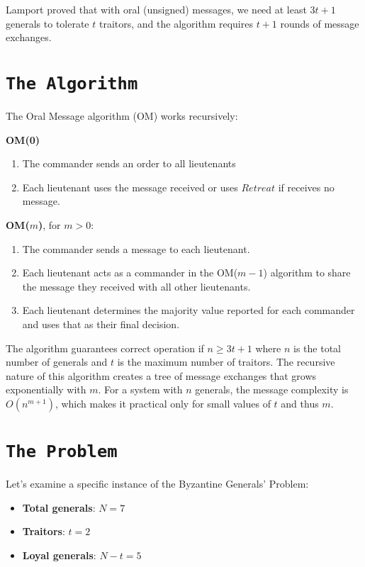 \documentclass[11pt]{article}
\begin{document}
Lamport proved that with oral (unsigned) messages, we need at least $3t+1$ generals to tolerate $t$ traitors, and the algorithm requires $t+1$ rounds of message exchanges.

\section*{\texttt{\Large The Algorithm}}
\justifying
The Oral Message algorithm (OM) works recursively:

\textbf{OM(0)}
\begin{enumerate}
    \item The commander sends an order to all lieutenants
    \item Each lieutenant uses the message received or uses $Retreat$ if receives no message.
\end{enumerate}
\textbf{OM($m$)}, for $m > 0$:
\begin{enumerate}
    \item The commander sends a message to each lieutenant.
    \item Each lieutenant acts as a commander in the OM($m-1$) algorithm to share the message they received with all other lieutenants.
    \item Each lieutenant determines the majority value reported for each commander and uses that as their final decision.
\end{enumerate}

The algorithm guarantees correct operation if $n \geq 3t+1$ where $n$ is the total number of generals and $t$ is the maximum number of traitors.
The recursive nature of this algorithm creates a tree of message exchanges that grows exponentially with $m$. For a system with $n$ generals, the message complexity is $O(n^{m+1})$, which makes it practical only for small values of $t$ and thus $m$.

\section*{\texttt{\Large The Problem}}
\justifying
Let's examine a specific instance of the Byzantine Generals' Problem:

\begin{itemize}
    \item \textbf{Total generals}: $N = 7$
    \item \textbf{Traitors}: $t = 2$
    \item \textbf{Loyal generals}: $N - t = 5$
\end{itemize}
\end{document}

